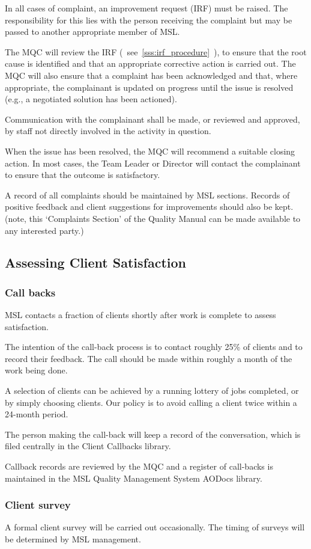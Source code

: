 In all cases of complaint, an improvement request (IRF) must be raised. The responsibility for this lies with the person receiving the complaint but may be passed to another appropriate member of MSL.

The MQC will review the IRF (~see~\ref{sss:irf_procedure}~), to ensure that the root cause is identified and that an appropriate corrective action is carried out.  
The MQC will also ensure that a complaint has been acknowledged and that, where appropriate, the complainant is updated on progress until the issue is resolved (e.g., a negotiated solution has been actioned). 

Communication with the complainant shall be made, or reviewed and approved, by staff not directly involved in the activity in question.

When the issue has been resolved, the MQC will recommend a suitable closing action. In most cases, the Team Leader or Director will contact the complainant to ensure that the outcome is satisfactory. 

A record of all complaints should be maintained by MSL sections. Records of positive feedback and client suggestions for improvements should also be kept.
(note, this `Complaints Section' of the Quality Manual can be made available to any interested party.)

\subsection{Assessing Client Satisfaction}
\label{ss:client_satisfaction}
\subsubsection{Call backs}
MSL contacts a fraction of clients shortly after work is complete to assess satisfaction.

The intention of the call-back process is to contact roughly 25\% of clients and to record their feedback. The call should be made within roughly a month of the work being done.

A selection of clients can be achieved by a running lottery of jobs completed, or by simply choosing clients. Our policy is to avoid calling a client twice within a 24-month period.

The person making the call-back will keep a record of the conversation, which is filed centrally in the Client Callbacks library. 

Callback records are reviewed by the MQC and a register of call-backs is maintained in the MSL Quality Management System AODocs library.

\subsubsection{Client survey}
A formal client survey will be carried out occasionally. The timing of surveys will be determined by MSL management.